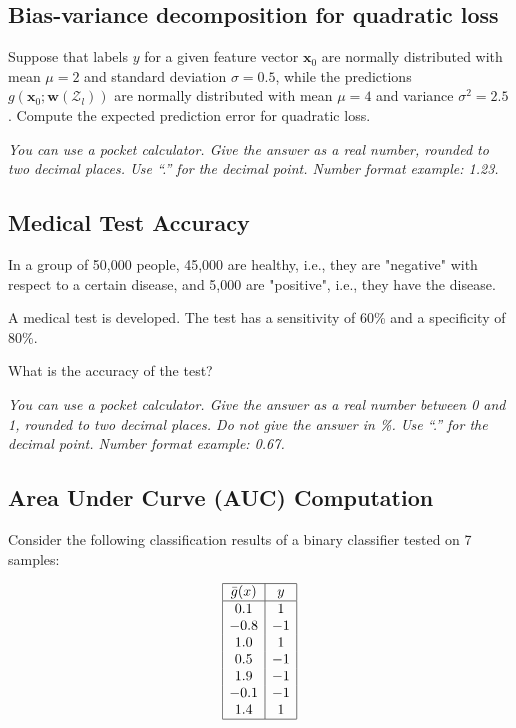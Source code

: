 \documentclass{article}
\begin{document}
\subsection*{Bias-variance decomposition for quadratic loss}

Suppose that labels \( y \) for a given feature vector \( \mathbf{x}_0 \) are normally distributed with mean \( \mu = 2 \) and standard deviation \( \sigma = 0.5 \), while the predictions \( g(\mathbf{x}_0; \mathbf{w}(\mathcal{Z}_l)) \) are normally distributed with mean \( \mu = 4 \) and variance \( \sigma^2 = 2.5 \). Compute the expected prediction error for quadratic loss.

\textit{You can use a pocket calculator. Give the answer as a real number, rounded to two decimal places. Use ``.'' for the decimal point. Number format example: 1.23.}

\subsection*{Medical Test Accuracy}

In a group of 50,000 people, 45,000 are healthy, i.e., they are "negative" with respect to a certain disease, and 5,000 are "positive", i.e., they have the disease.

A medical test is developed. The test has a sensitivity of 60\% and a specificity of 80\%. 

What is the accuracy of the test?

\textit{You can use a pocket calculator. Give the answer as a real number between 0 and 1, rounded to two decimal places. Do not give the answer in \%. Use ``.'' for the decimal point. Number format example: 0.67.}

\subsection*{Area Under Curve (AUC) Computation}

Consider the following classification results of a binary classifier tested on 7 samples:

\[
\begin{array}{|c|c|}
\hline
\bar{g}(x) & y \\
\hline
0.1 & 1 \\
-0.8 & -1 \\
1.0 & 1 \\
0.5 & -1 \\
1.9 & -1 \\
-0.1 & -1 \\
1.4 & 1 \\
\hline
\end{array}
\]
\end{document}
